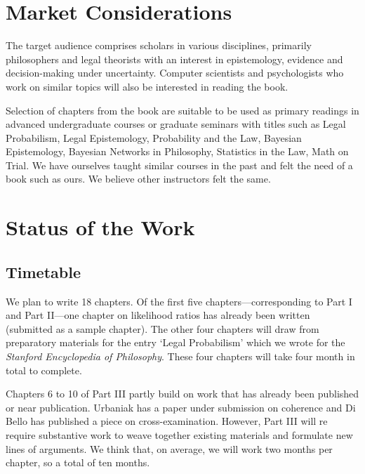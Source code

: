 \documentclass[
  10pt,
  dvipsnames,enabledeprecatedfontcommands]{scrartcl}
\begin{document}
\hypertarget{market-considerations}{%
\section{Market Considerations}\label{market-considerations}}

\normalsize

The target audience comprises scholars in various disciplines, primarily
philosophers and legal theorists with an interest in epistemology,
evidence and decision-making under uncertainty. Computer scientists and
psychologists who work on similar topics will also be interested in
reading the book.

Selection of chapters from the book are suitable to be used as primary
readings in advanced undergraduate courses or graduate seminars with
titles such as Legal Probabilism, Legal Epistemology, Probability and
the Law, Bayesian Epistemology, Bayesian Networks in Philosophy,
Statistics in the Law, Math on Trial. We have ourselves taught similar
courses in the past and felt the need of a book such as ours. We believe
other instructors felt the same.

\hypertarget{status-of-the-work}{%
\section{Status of the Work}\label{status-of-the-work}}

\hypertarget{timetable}{%
\subsection{Timetable}\label{timetable}}

We plan to write 18 chapters. Of the first five chapters---corresponding
to Part I and Part II---one chapter on likelihood ratios has already
been written (submitted as a sample chapter). The other four chapters
will draw from preparatory materials for the entry `Legal Probabilism'
which we wrote for the \textit{Stanford Encyclopedia of Philosophy}.
These four chapters will take four month in total to complete.

Chapters 6 to 10 of Part III partly build on work that has already been
published or near publication. Urbaniak has a paper under submission on
coherence and Di Bello has published a piece on cross-examination.
However, Part III will re require substantive work to weave together
existing materials and formulate new lines of arguments. We think that,
on average, we will work two months per chapter, so a total of ten
months.
\end{document}
